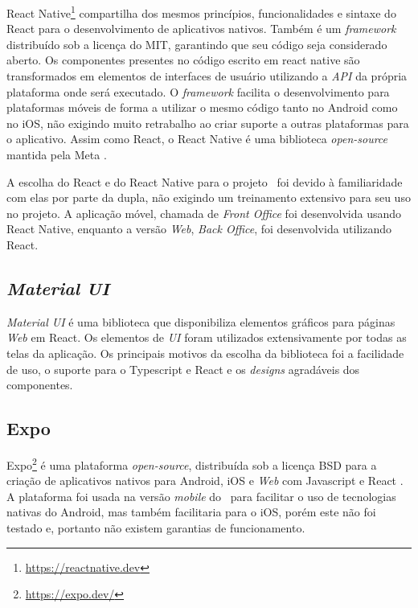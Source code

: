 React Native\footnote{\url{https://reactnative.dev}} compartilha dos mesmos princípios, funcionalidades e sintaxe do React para o desenvolvimento de aplicativos nativos. Também é um \textit{framework} distribuído sob a licença do MIT, garantindo que seu código seja considerado aberto. Os componentes presentes no código escrito em react native são transformados em elementos de interfaces de usuário utilizando a \textit{API} da própria plataforma onde será executado. O \textit{framework} facilita o desenvolvimento para plataformas móveis de forma a utilizar o mesmo código tanto no Android como no iOS, não exigindo muito retrabalho ao criar suporte a outras plataformas para o aplicativo. Assim como React, o React Native é uma biblioteca \textit{open-source} mantida pela Meta \cite{react-native}.

A escolha do React e do React Native para o projeto \appName\ foi devido à familiaridade com elas por parte da dupla, não exigindo um treinamento extensivo para seu uso no projeto. A aplicação móvel, chamada de \textit{Front Office} foi desenvolvida usando React Native, enquanto a versão \textit{Web}, \textit{Back Office}, foi desenvolvida utilizando React.

\subsection{\textit{Material UI}}

\textit{Material UI} \cite{mui} é uma biblioteca que disponibiliza elementos gráficos para páginas \textit{Web} em React. Os elementos de \textit{UI} foram utilizados extensivamente por todas as telas da aplicação. Os principais motivos da escolha da biblioteca foi a facilidade de uso, o suporte para o Typescript e React e os \textit{designs} agradáveis dos componentes.

\subsection{Expo}

Expo\footnote{\url{https://expo.dev/}} é uma plataforma \textit{open-source}, distribuída sob a licença BSD para a criação de aplicativos nativos para Android, iOS e \textit{Web} com Javascript e React \cite{expo}. A plataforma foi usada na versão \textit{mobile} do \appName\ para facilitar o uso de tecnologias nativas do Android, mas também facilitaria para o iOS, porém este não foi testado e, portanto não existem garantias de funcionamento.

